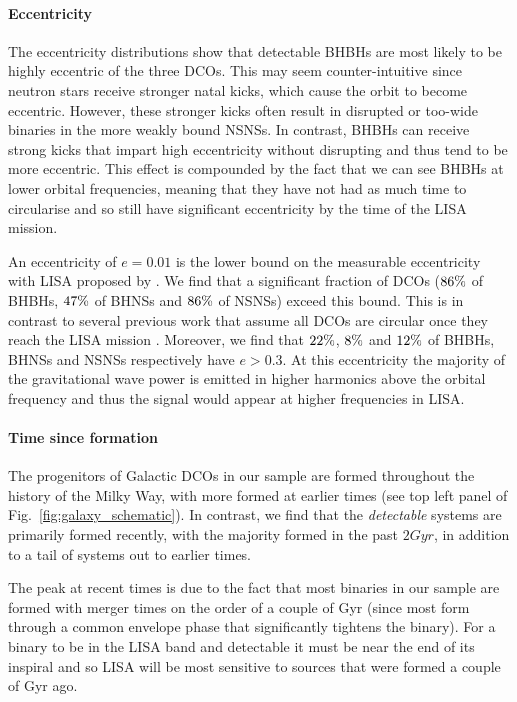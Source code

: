 \paragraph{Eccentricity} The eccentricity distributions show that detectable BHBHs are most likely to be highly eccentric of the three DCOs. This may seem counter-intuitive since neutron stars receive stronger natal kicks, which cause the orbit to become eccentric. However, these stronger kicks often result in disrupted or too-wide binaries in the more weakly bound NSNSs. In contrast, BHBHs can receive strong kicks that impart high eccentricity without disrupting and thus tend to be more eccentric. This effect is compounded by the fact that we can see BHBHs at lower orbital frequencies, meaning that they have not had as much time to circularise and so still have significant eccentricity by the time of the LISA mission.

An eccentricity of $e = 0.01$ is the lower bound on the measurable eccentricity with LISA proposed by \citet{Nishizawa+2016}. We find that a significant fraction of DCOs ($86\%{}$ of BHBHs, $47\%{}$ of BHNSs and $86\%{}$ of NSNSs) exceed this bound. This is in contrast to several previous work that assume all DCOs are circular once they reach the LISA mission \citep[e.g.][]{Lamberts+2018, Sesana+2020}. Moreover, we find that $22\%{}$, $8\%{}$ and $12\%{}$ of BHBHs, BHNSs and NSNSs respectively have $e > 0.3$. At this eccentricity the majority of the gravitational wave power is emitted in higher harmonics above the orbital frequency \citep[Eq.~20]{Peters+1963} and thus the signal would appear at higher frequencies in LISA.

\paragraph{Time since formation} The progenitors of Galactic DCOs in our sample are formed throughout the history of the Milky Way, with more formed at earlier times (see top left panel of Fig.~\ref{fig:galaxy_schematic}). In contrast, we find that the \textit{detectable} systems are primarily formed recently, with the majority formed in the past $2 \unit{Gyr}$, in addition to a tail of systems out to earlier times.

The peak at recent times is due to the fact that most binaries in our sample are formed with merger times on the order of a couple of Gyr (since most form through a common envelope phase that significantly tightens the binary). For a binary to be in the LISA band and detectable it must be near the end of its inspiral and so LISA will be most sensitive to sources that were formed a couple of Gyr ago.

